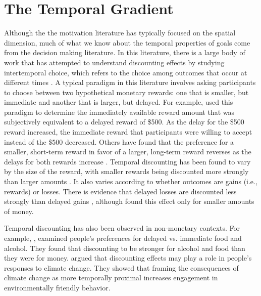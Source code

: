 \documentclass[a4paper,doc,natbib,donotrepeattitle]{apa6}
\begin{document}
\section{The Temporal Gradient}

Although the the motivation literature has typically focused on the spatial dimension, much of what we know about the temporal properties of goals come from the decision making literature. In this literature, there is a large body of work that has attempted to understand discounting effects by studying intertemporal choice, which refers to the choice among outcomes that occur at different times \citep{Dai2014}. A typical paradigm in this literature involves asking participants to choose between two hypothetical monetary rewards: one that is smaller, but immediate and another that is larger, but delayed. For example, \cite{Murphy2001} used this paradigm to determine the immediately available reward amount that was subjectively equivalent to a delayed reward of \$500. As the delay for the \$500 reward increased, the immediate reward that participants were willing to accept instead of the \$500 decreased. Others have found that the preference for a smaller, short-term reward in favor of a larger, long-term reward reverses as the delays for both rewards increase \citep{Green1994,Kirby1995}. Temporal discounting has been found to vary by the size of the reward, with smaller rewards being discounted more strongly than larger amounts \citep{Estle2006}. It also varies according to whether outcomes are gains (i.e., rewards) or losses. There is evidence that delayed losses are discounted less strongly than delayed gains  %
\citep{Murphy2001,Goncalves2015}, although \cite{Estle2006} found this effect only for smaller amounts of money.

Temporal discounting has also been observed in non-monetary contexts. For example, \cite{Odum2003}, examined people's preferences for delayed vs. immediate food and alcohol. They found that discounting to be stronger for alcohol and food than they were for money. \cite{Bashir2014} argued that discounting effects may play a role in people's responses to climate change. They showed that framing the consequences of climate change as more temporally proximal increases engagement in environmentally friendly behavior.
\end{document}
